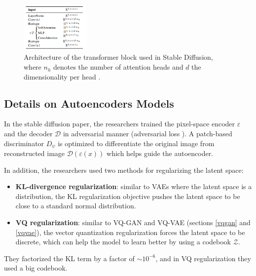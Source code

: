 \begin{figure}[h]
    \centering
    \includegraphics[width=0.3\textwidth]{images/diffusion_models/stable_diffusion/transformer_block.png}
    \caption{Architecture of the transformer block used in Stable Diffusion, where $n_h$ denotes the number of attention heads and $d$ the dimensionality per head \cite{stable_diffusion}.}
\end{figure}











\subsection{Details on Autoencoders Models}

In the stable diffusion paper, the researchers trained the pixel-space encoder $\varepsilon$ and the decoder $\mathcal{D}$ in adversarial manner (adversarial loss \cite{vqgan}). A patch-based discriminator $D_\psi$ is optimized to differentiate the original image from reconstructed image $\mathcal{D} (\varepsilon (x))$ which helps guide the autoencoder.

In addition, the researchers used two methods for regularizing the latent space:

\begin{itemize}
    \item \textbf{KL-divergence regularization}: similar to VAEs where the latent space is a distribution, the KL regularization objective pushes the latent space to be close to a standard normal distribution.
    \item \textbf{VQ regularization}: similar to VQ-GAN and VQ-VAE (sections \ref{vqgan} and \ref{vqvae}), the vector quantization regularization forces the latent space to be discrete, which can help the model to learn better by using a codebook $\mathcal{Z}$.
\end{itemize}

They factorized the KL term by a factor of $\sim 10^{-6}$, and in VQ regularization they used a big codebook.


